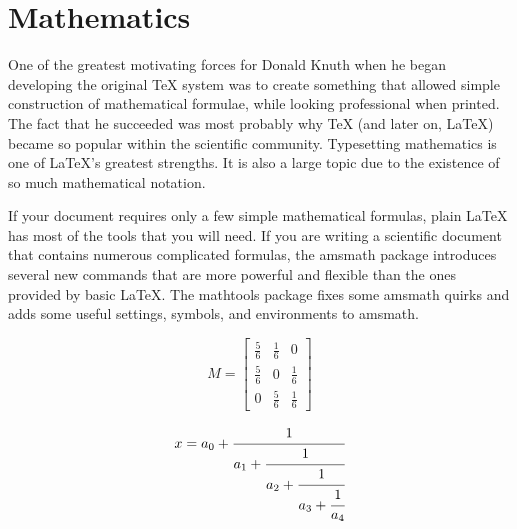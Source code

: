 \chapter{Mathematics}

One of the greatest motivating forces for Donald Knuth when he began developing the original TeX system was to create something that allowed simple construction of mathematical formulae, while looking professional when printed. The fact that he succeeded was most probably why TeX (and later on, LaTeX) became so popular within the scientific community. Typesetting mathematics is one of LaTeX's greatest strengths. It is also a large topic due to the existence of so much mathematical notation.

If your document requires only a few simple mathematical formulas, plain LaTeX has most of the tools that you will need. If you are writing a scientific document that contains numerous complicated formulas, the amsmath package introduces several new commands that are more powerful and flexible than the ones provided by basic LaTeX. The mathtools package fixes some amsmath quirks and adds some useful settings, symbols, and environments to amsmath.

$$M = \begin{bmatrix}
\frac{5}{6} & \frac{1}{6} & 0           \\[0.3em]
\frac{5}{6} & 0           & \frac{1}{6} \\[0.3em]
0           & \frac{5}{6} & \frac{1}{6}
\end{bmatrix}$$

\begin{equation}
x = a_0 + \cfrac{1}{a_1 
	+ \cfrac{1}{a_2 
		+ \cfrac{1}{a_3 + \cfrac{1}{a_4} } } }
\end{equation}



